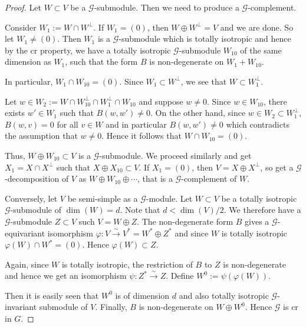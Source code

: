 \documentclass[11pt,a4paper]{article}
\theoremstyle{plain}
\theoremstyle{definition}
\begin{document}
\begin{proof}
Let $W \subset V$ be a $\mathcal{G}$-submodule. Then we need to produce a $\mathcal{G}$-complement.

Consider $W_1 := W \cap W^\perp$. If $W_1 = (0)$, then $W \oplus W^\perp = V$ and we are done. So let $W_1 \neq (0)$. Then $W_1$ is a $\mathcal{G}$-submodule which is totally isotropic and hence by the cr property, we have a totally isotropic $\mathcal{G}$-submodule $W_{10}$ of the same dimension as $W_1$, such that the form $B$ is non-degenerate on $W_1 + W_{10}$.

In particular, $W_1 \cap W_{10} = (0)$. Since $W_1 \subset W^\perp$, we see that $W \subset W_1^\perp$.

Let $w \in W_2 := W \cap W_{10}^\perp \cap W_1^\perp \cap W_{10}$ and suppose $w \neq 0$. Since $w \in W_{10}$, there exists $w' \in W_1$ such that $B(w, w') \neq 0$. On the other hand, since $w \in W_2 \subset W_1^\perp$, $B(w, v) = 0$ for all $v \in W$ and in particular $B(w, w') \neq 0$ which contradicts the assumption that $w \neq 0$. Hence it follows that $W \cap W_{10} = (0)$.

Thus, $W \oplus W_{10} \subset V$ is a $\mathcal{G}$-submodule. We proceed similarly and get $X_1 = X \cap X^\perp$ such that $X \oplus X_{10} \subset V$. If $X_1 = (0)$, then $V = X \oplus X^\perp$, so get a $\mathcal{G}$-decomposition of $V$ as $W \oplus W_{10} \oplus \cdots$, that is a $\mathcal{G}$-complement of $W$.

Conversely, let $V$ be semi-simple as a $\mathcal{G}$-module. Let $W \subset V$ be a totally isotropic $\mathcal{G}$-submodule of $\dim(W) = d$. Note that $d < \dim(V)/2$. We therefore have a $\mathcal{G}$-submodule $Z \subset V$ such $V = W \oplus Z$. The non-degenerate form $B$ gives a $\mathcal{G}$-equivariant isomorphism $\varphi : V \xrightarrow{\sim} V^* = W^* \oplus Z^*$ and since $W$ is totally isotropic $\varphi(W) \cap W^* = (0)$. Hence $\varphi(W) \subset Z$.

Again, since $W$ is totally isotropic, the restriction of $B$ to $Z$ is non-degenerate and hence we get an isomorphism $\psi : Z^* \xrightarrow{\sim} Z$. Define $W^0 := \psi(\varphi(W))$.

Then it is easily seen that $W^0$ is of dimension $d$ and also totally isotropic $\mathcal{G}$-invariant submodule of $V$. Finally, $B$ is non-degenerate on $W \oplus W^0$. Hence $\mathcal{G}$ is cr in $G$. \qedhere
\end{proof}


\end{document}
